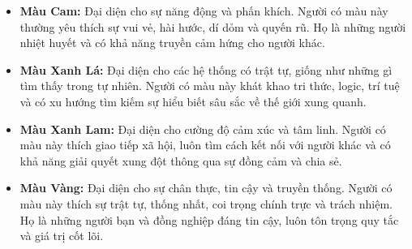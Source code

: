 \begin{itemize}
    \item \textbf{Màu Cam:} Đại diện cho sự năng động và phấn khích. Người có màu này thường yêu thích sự vui vẻ, hài hước, dí dỏm và quyến rũ. Họ là những người nhiệt huyết và có khả năng truyền cảm hứng cho người khác.
    \item \textbf{Màu Xanh Lá:} Đại diện cho các hệ thống có trật tự, giống như những gì tìm thấy trong tự nhiên. Người có màu này khát khao tri thức, logic, trí tuệ và có xu hướng tìm kiếm sự hiểu biết sâu sắc về thế giới xung quanh.
    \item \textbf{Màu Xanh Lam:} Đại diện cho cường độ cảm xúc và tâm linh. Người có màu này thích giao tiếp xã hội, luôn tìm cách kết nối với người khác và có khả năng giải quyết xung đột thông qua sự đồng cảm và chia sẻ.
    \item \textbf{Màu Vàng:} Đại diện cho sự chân thực, tin cậy và truyền thống. Người có màu này thích sự trật tự, thống nhất, coi trọng chính trực và trách nhiệm. Họ là những người bạn và đồng nghiệp đáng tin cậy, luôn tôn trọng quy tắc và giá trị cốt lõi.
\end{itemize}

